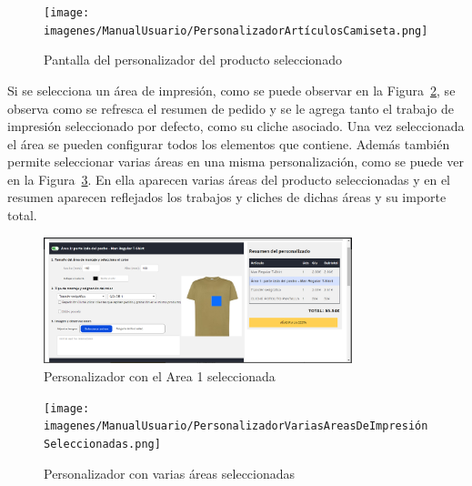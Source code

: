 \documentclass[12pt]{article}
\begin{document}
\begin{figure}[ht]
    \centering
    \texttt{[image: imagenes/ManualUsuario/PersonalizadorArtículosCamiseta.png]}
    \caption{\label{fig:Personalizador}Pantalla del personalizador del producto seleccionado}
    \vspace{\fill}
\end{figure}

Si se selecciona un área de impresión, como se puede observar en la Figura~\ref{fig:PersonalizadorAreaMarcada}, se observa como se refresca el resumen de pedido y se le agrega tanto el trabajo de impresión
seleccionado por defecto, como su cliche asociado. Una vez seleccionada el área se pueden configurar todos los elementos que contiene. Además también permite seleccionar varias áreas en una misma personalización, como 
se puede ver en la Figura~\ref{fig:PersonalizadorVariasAreas}. En ella aparecen varias áreas del producto seleccionadas y en el resumen aparecen reflejados los trabajos y cliches de dichas áreas y su importe total.

\begin{figure}[ht]
    \centering
    \includegraphics[width=0.8\textwidth]{imagenes/ManualUsuario/PersonalizadorArea1Seleccionada.png}
    \caption{\label{fig:PersonalizadorAreaMarcada}Personalizador con el Area 1 seleccionada}
    \vspace{\fill}
\end{figure}

\begin{figure}[ht]
    \centering
    \texttt{[image: imagenes/ManualUsuario/PersonalizadorVariasAreasDeImpresiónSeleccionadas.png]}
    \caption{\label{fig:PersonalizadorVariasAreas}Personalizador con varias áreas seleccionadas}
    \vspace{\fill}
\end{figure}
\end{document}
